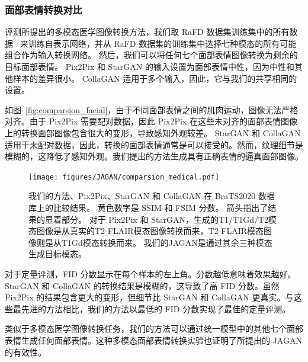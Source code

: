 \subsubsection{面部表情转换对比}
评测所提出的多模态医学图像转换方法，我们取 RaFD 数据集训练集中的所有数据~\cite{langner2010presentation} 来训练自表示网络，并从 RaFD 数据集的训练集中选择七种模态的所有可能组合作为输入转换网络。
然后，我们可以将任何七个面部表情图像转换为剩余的目标面部表情。 Pix2Pix 和 StarGAN 的输入设置为面部表情中性，因为中性和其他样本的差异很小。 CollaGAN 适用于多个输入，因此，它与我们的共享相同的设置。

如图~\ref{fig:comparsion_facial}，由于不同面部表情之间的肌肉运动，图像无法严格对齐。由于 Pix2Pix 需要配对数据，因此 Pix2Pix 在这些未对齐的面部表情图像上的转换面部图像包含很大的变形，导致感知外观较差。 StarGAN 和 CollaGAN 适用于未配对数据，因此，转换的面部表情通常是可以接受的。然而，纹理细节是模糊的，这降低了感知外观。我们提出的方法生成具有正确表情的逼真面部图像。

\begin{figure}
	\begin{center}
		\texttt{[image: figures/JAGAN/comparsion\_medical.pdf]}
	\end{center}
	\caption{我们的方法、Pix2Pix、StarGAN 和 CollaGAN 在 BraTS2020 数据库上的比较结果。 黄色数字是 SSIM 和 FSIM 分数。 箭头指出了结果的显着部分。 对于 Pix2Pix 和 StarGAN，生成的T1/T1Gd/T2模态图像是从真实的T2-FLAIR模态图像转换而来，T2-FLAIR模态图像则是从T1Gd模态转换而来。 我们的JAGAN是通过其余三种模态生成目标模态。}
	\label{fig:comparsion_medical}
\end{figure}

对于定量评测，FID 分数显示在每个样本的左上角。分数越低意味着效果越好。 StarGAN 和 CollaGAN 的转换结果是模糊的，这导致了高 FID 分数。虽然 Pix2Pix 的结果包含更大的变形，但细节比 StarGAN 和 CollaGAN 更真实。与这些最先进的方法相比，我们的方法以最低的 FID 分数实现了最佳的定量评测。

类似于多模态医学图像转换任务，我们的方法可以通过统一模型中的其他七个面部表情生成任何面部表情。这种多模态面部表情转换实验也证明了所提出的 JAGAN 的有效性。

